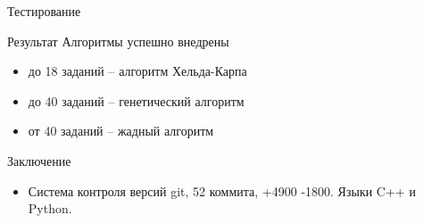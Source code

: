 \documentclass{beamer}
\begin{document}
\begin{frame}{Тестирование}

\end{frame}

\begin{frame}{Результат}
Алгоритмы успешно внедрены
\begin{itemize}
\item до 18 заданий -- алгоритм Хельда-Карпа
\item до 40 заданий -- генетический алгоритм
\item от 40 заданий -- жадный алгоритм
\end{itemize}
\end{frame}

\begin{frame}{Заключение}
\begin{itemize}
\item Система контроля версий git, 52 коммита, +4900 -1800. Языки C++ и Python.
\end{itemize}

\end{frame}
\end{document}
